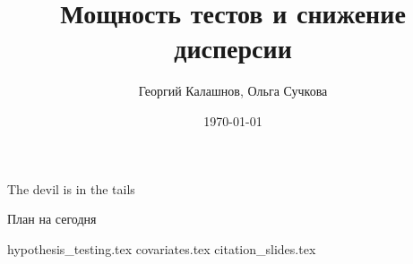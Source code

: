 \title{Мощность тестов и снижение дисперсии}
\author[Георгий Калашнов, Ольга Сучкова]{Георгий Калашнов, Ольга Сучкова}
\date{\today}



\begin{frame}
  \titlepage
  \begin{flushright}
  The devil is in the tails
  \end{flushright}
\end{frame}

\begin{frame}{План на сегодня} 
\tableofcontents
\end{frame}

{hypothesis_testing.tex}
{covariates.tex}
{citation_slides.tex}


